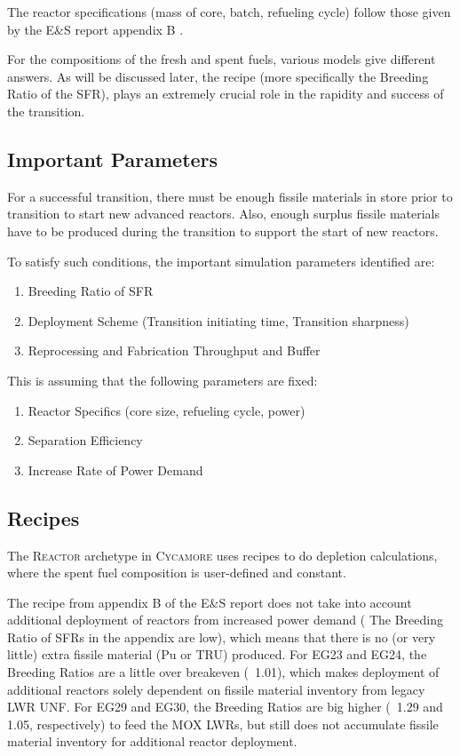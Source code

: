 \documentclass{article}
\newcommand{\Cycamore}{\textsc{Cycamore}\xspace}%
\begin{document}
The reactor specifications (mass of core, batch, refueling cycle) follow
those given by the E\&S report appendix B \cite{wigeland_nuclear_2014}.

For the compositions of the fresh and spent fuels, various models give different answers.
As will be discussed later, the recipe (more specifically the Breeding Ratio of the \gls{SFR}),
plays an extremely crucial role in the rapidity and success of the transition. 

\subsection{Important Parameters}
For a successful transition, there must be enough fissile materials in store prior to transition
to start new advanced reactors. Also, enough surplus fissile materials have to be produced
during the transition to support the start of new reactors.

To satisfy such conditions, the important simulation parameters identified are:
\begin{enumerate}
	\item Breeding Ratio of \gls{SFR}
	\item Deployment Scheme (Transition initiating time, Transition sharpness)
	\item Reprocessing and Fabrication Throughput and Buffer
\end{enumerate}


This is assuming that the following parameters are fixed:
\begin{enumerate}
	\item Reactor Specifics (core size, refueling cycle, power)
	\item Separation Efficiency
	\item Increase Rate of Power Demand
\end{enumerate}

\subsection{Recipes}
The \textsc{Reactor}\xspace archetype in \Cycamore uses recipes to do depletion calculations,
where the spent fuel composition is user-defined and constant. 

The recipe from appendix B of the E\&S report does not take into account
additional deployment of reactors from increased power demand ( The Breeding Ratio
of \glspl{SFR} in the appendix are low), which means that there is no (or very little)
extra fissile material (Pu or TRU) produced. For EG23 and EG24, the Breeding Ratios are
a little over breakeven (~1.01), which makes deployment of additional reactors solely 
dependent on fissile material inventory from legacy LWR \gls{UNF}. For EG29 and EG30,
the Breeding Ratios are big higher (~1.29 and 1.05, respectively) to feed the
\gls{MOX} \glspl{LWR}, but still does not accumulate fissile material inventory for
additional reactor deployment.
\end{document}
